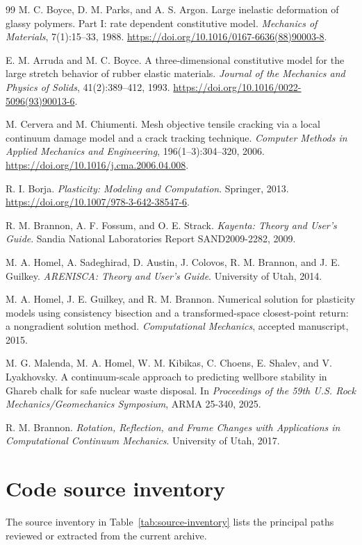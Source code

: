 \begin{thebibliography}{99}
M. C. Boyce, D. M. Parks, and A. S. Argon.
\newblock Large inelastic deformation of glassy polymers. Part I: rate dependent constitutive model.
\newblock \emph{Mechanics of Materials}, 7(1):15--33, 1988.
\newblock \url{https://doi.org/10.1016/0167-6636(88)90003-8}.

E. M. Arruda and M. C. Boyce.
\newblock A three-dimensional constitutive model for the large stretch behavior of rubber elastic materials.
\newblock \emph{Journal of the Mechanics and Physics of Solids}, 41(2):389--412, 1993.
\newblock \url{https://doi.org/10.1016/0022-5096(93)90013-6}.

M. Cervera and M. Chiumenti.
\newblock Mesh objective tensile cracking via a local continuum damage model and a crack tracking technique.
\newblock \emph{Computer Methods in Applied Mechanics and Engineering}, 196(1--3):304--320, 2006.
\newblock \url{https://doi.org/10.1016/j.cma.2006.04.008}.

R. I. Borja.
\newblock \emph{Plasticity: Modeling and Computation}.
\newblock Springer, 2013.
\newblock \url{https://doi.org/10.1007/978-3-642-38547-6}.



R. M. Brannon, A. F. Fossum, and O. E. Strack.
\newblock \emph{Kayenta: Theory and User's Guide}.
\newblock Sandia National Laboratories Report SAND2009-2282, 2009.

M. A. Homel, A. Sadeghirad, D. Austin, J. Colovos, R. M. Brannon, and J. E. Guilkey.
\newblock \emph{ARENISCA: Theory and User's Guide}.
\newblock University of Utah, 2014.

M. A. Homel, J. E. Guilkey, and R. M. Brannon.
\newblock Numerical solution for plasticity models using consistency bisection and a transformed-space closest-point return: a nongradient solution method.
\newblock \emph{Computational Mechanics}, accepted manuscript, 2015.

M. G. Malenda, M. A. Homel, W. M. Kibikas, C. Choens, E. Shalev, and V. Lyakhovsky.
\newblock A continuum-scale approach to predicting wellbore stability in Ghareb chalk for safe nuclear waste disposal.
\newblock In \emph{Proceedings of the 59th U.S. Rock Mechanics/Geomechanics Symposium}, ARMA 25-340, 2025.

R. M. Brannon.
\newblock \emph{Rotation, Reflection, and Frame Changes with Applications in Computational Continuum Mechanics}.
\newblock University of Utah, 2017.

\end{thebibliography}

\section{Code source inventory}
\label{sec:source-inventory}
The source inventory in Table~\ref{tab:source-inventory} lists the principal paths reviewed or extracted from the current archive.

